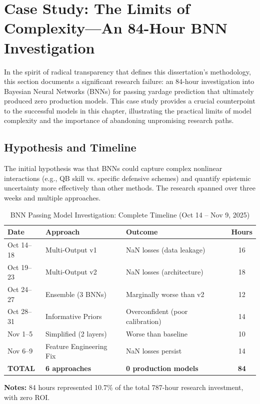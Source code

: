 \section{Case Study: The Limits of Complexity—An 84-Hour BNN Investigation}
\label{sec:bnn-failure-case-study}

In the spirit of radical transparency that defines this dissertation's methodology, this section documents a significant research failure: an 84-hour investigation into Bayesian Neural Networks (BNNs) for passing yardage prediction that ultimately produced zero production models. This case study provides a crucial counterpoint to the successful models in this chapter, illustrating the practical limits of model complexity and the importance of abandoning unpromising research paths.

\subsection{Hypothesis and Timeline}

The initial hypothesis was that BNNs could capture complex nonlinear interactions (e.g., QB skill vs. specific defensive schemes) and quantify epistemic uncertainty more effectively than other methods. The research spanned over three weeks and multiple approaches.

\begin{table}[h]
\centering
\caption{BNN Passing Model Investigation: Complete Timeline (Oct 14 -- Nov 9, 2025)}
\label{tab:bnn-timeline-condensed}
\begin{tabular}{@{}lllS[table-format=2.0]@{}}
\toprule
\textbf{Date} & \textbf{Approach} & \textbf{Outcome} & {\textbf{Hours}} \\
\midrule
Oct 14--18 & Multi-Output v1 & NaN losses (data leakage) & 16 \\
Oct 19--23 & Multi-Output v2 & NaN losses (architecture) & 18 \\
Oct 24--27 & Ensemble (3 BNNs) & Marginally worse than v2 & 12 \\
Oct 28--31 & Informative Priors & Overconfident (poor calibration) & 14 \\
Nov 1--5 & Simplified (2 layers) & Worse than baseline & 10 \\
Nov 6--9 & Feature Engineering Fix & NaN losses persist & 14 \\
\midrule
\textbf{TOTAL} & \textbf{6 approaches} & \textbf{0 production models} & \textbf{84} \\
\bottomrule
\end{tabular}
\begin{tablenotes}
\item \textbf{Notes:} 84 hours represented 10.7\% of the total 787-hour research investment, with zero ROI.
\end{tablenotes}
\end{table}

